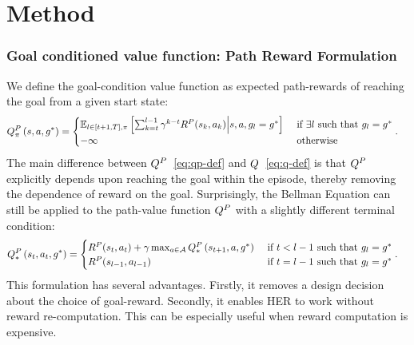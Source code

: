 \section{Method}

\subsubsection{Goal conditioned value function: Path Reward Formulation}
We define the goal-condition value function as expected path-rewards of reaching
the goal from a given start state:
%
\begin{align}
  \fwargs\state\act{\goal^*}\policy{P}
  &=
    \begin{cases}
      \E_{l \in [t+1, T], \policy}\left[ \sum_{k=t}^{l-1}
  \discount^{k-t} \Rew^P(\state_k, \act_k)
  \middle| \state, \act, \goal_l = \goal^* \right]
& \text{ if } \exists l \text{ such that } \goal_l = \goal^*
\\
-\infty & \text{ otherwise }
\end{cases}.
  \label{eq:qp-def}
\end{align}%
% 
The main difference between $Q^P$~\eqref{eq:qp-def} and $Q$~\eqref{eq:q-def}
is that $Q^P$ explicitly depends upon reaching the goal within the episode,
thereby removing the dependence of reward on the goal. Surprisingly, the Bellman
Equation can still be applied to the path-value function $Q^P$ with a slightly
different terminal condition:
%
\begin{align}
  \fwargs{\state_t}{\act_t}{\goal^*}*P
  &=
    \begin{cases}
      \Rew^P(\state_t, \act_t) + \discount \max_{\act \in \Action} \fwargs{\state_{t+1}}\act{\goal^*}*P
      & \text{ if } t < l-1 \text{ such that } \goal_l = \goal^*
      \\
      \Rew^P(\state_{l-1}, \act_{l-1}) & \text{ if } t = l-1 \text{ such that } \goal_l = \goal^*
    \end{cases}.
  \label{eq:bellman-path}
\end{align}%
% 
This formulation has several advantages. Firstly, it removes a design decision
about the choice of goal-reward. Secondly, it enables HER to work without reward
re-computation. This can be especially useful when reward computation is expensive.

